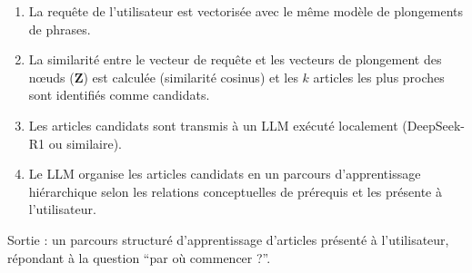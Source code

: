 \begin{enumerate}
    \item La requête de l'utilisateur est vectorisée avec le même modèle de plongements de phrases.
    \item La similarité entre le vecteur de requête et les vecteurs de plongement des n\oe uds ($\mathbf{Z}$) est calculée (similarité cosinus) et les $k$ articles les plus proches sont identifiés comme candidats.
    \item Les articles candidats sont transmis à un LLM exécuté localement (DeepSeek-R1 ou similaire).
    \item Le LLM organise les articles candidats en un parcours d'apprentissage hiérarchique selon les relations conceptuelles de prérequis et les présente à l'utilisateur.
\end{enumerate}

Sortie : un parcours structuré d'apprentissage d'articles présenté à l'utilisateur, répondant à la question ``par où commencer ?''.